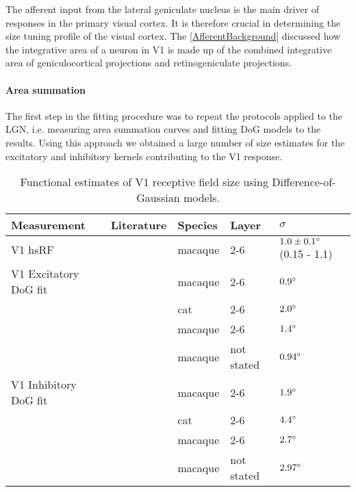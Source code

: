 The afferent input from the lateral geniculate nucleus is the main
driver of responses in the primary visual cortex. It is therefore
crucial in determining the size tuning profile of the visual cortex.
The \ref{AfferentBackground} discussed how the integrative area of a
neuron in V1 is made up of the combined integrative area of
geniculocortical projections and retinogeniculate projections.

\paragraph{Area summation}

The first step in the fitting procedure was to repeat the protocols
applied to the LGN, i.e. measuring area summation curves and fitting
DoG models to the results. Using this approach we obtained a large
number of size estimates for the excitatory and inhibitory kernels
contributing to the V1 response.

\begin{table}
  \centering
  \begin{adjustbox}{width=1\textwidth}
  \begin{tabular}{l | l l l l}
    Measurement              & Literature            & Species & Layer & $\sigma$ \\
    \hline
    V1 hsRF                  & \cite{Levitt2002}     & macaque & 2-6 & $1.0 \pm 0.1 \degree$ (0.15 - 1.1) \\
    \hline
    V1 Excitatory DoG fit    & \cite{Levitt2002}     & macaque & 2-6 & $0.9 \degree$ \\
                             & \cite{Sceniak2001}    & cat     & 2-6 & $2.0 \degree$ \\
                             & \cite{Cavanaugh2002}  & macaque & 2-6 & $1.4 \degree$ \\
                             & \cite{Solomon2002}    & macaque & not stated & $0.94 \degree$ \\
    \hline
    V1 Inhibitory DoG fit    & \cite{Levitt2002}     & macaque & 2-6 & $1.9 \degree$ \\
                             & \cite{Sceniak2001}    & cat     & 2-6 & $4.4 \degree$ \\
                             & \cite{Cavanaugh2002}  & macaque & 2-6 & $2.7 \degree$ \\
                             & \cite{Solomon2002}    & macaque & not stated & $2.97 \degree$ \\
    \hline
  \end{tabular}
  \end{adjustbox}
  \caption[]%
          {Functional estimates of V1 receptive field size using Difference-of-Gaussian models.}
  \label{electrophystable}
\end{table}


